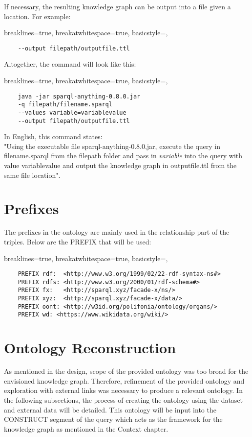 \noindent If necessary, the resulting knowledge graph can be output into a file given a location. For example:

\lstset
{
    breaklines=true,
    breakatwhitespace=true,
    basicstyle=\ttfamily,
}
\begin{lstlisting}
    --output filepath/outputfile.ttl
\end{lstlisting}

\noindent Altogether, the command will look like this:

\lstset
{
    breaklines=true,
    breakatwhitespace=true,
    basicstyle=\ttfamily,
}
\begin{lstlisting}
    java -jar sparql-anything-0.8.0.jar
    -q filepath/filename.sparql 
    --values variable=variablevalue 
    --output filepath/outputfile.ttl
\end{lstlisting}

\noindent In English, this command states: \\
\hspace*{0.5cm} "Using the executable file sparql-anything-0.8.0.jar, execute the query in filename.sparql from the filepath folder and pass in \textit{variable} into the query with value variablevalue and output the knowledge graph in outputfile.ttl from the same file location". 

\section{Prefixes}
\hspace*{0.5cm} The prefixes in the ontology are mainly used in the relationship part of the triples. Below are the PREFIX that will be used:

\lstset
{
    breaklines=true,
    breakatwhitespace=true,
    basicstyle=\ttfamily,
}
\begin{lstlisting}
    PREFIX rdf:  <http://www.w3.org/1999/02/22-rdf-syntax-ns#>
    PREFIX rdfs: <http://www.w3.org/2000/01/rdf-schema#>
    PREFIX fx:   <http://sparql.xyz/facade-x/ns/>
    PREFIX xyz:  <http://sparql.xyz/facade-x/data/>
    PREFIX oont: <http://w3id.org/polifonia/ontology/organs/>
    PREFIX wd: <https://www.wikidata.org/wiki/> 
\end{lstlisting}

\section{Ontology Reconstruction}
\hspace*{0.5cm} As mentioned in the design, scope of the provided ontology was too broad for the envisioned knowledge graph. Therefore, refinement of the provided ontology and exploration with external links was necessary to produce a relevant ontology. In the following subsections, the process of creating the ontology using the dataset and external data will be detailed. This ontology will be input into the CONSTRUCT segment of the query which acts as the framework for the knowledge graph as mentioned in the Context chapter. 

